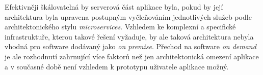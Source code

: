 Efektivněji škálovatelná by serverová část aplikace byla, pokud by její architektura byla upravena postupným vyčleňováním jednotlivých služeb podle architektonického stylu \textit{microservices}. Vzhledem ke komplexní a specifické infrastruktuře, kterou takové řešení vyžaduje, by ale taková architektura nebyla vhodná pro software dodávaný jako \textit{on premise}. Přechod na software \textit{on demand} je ale rozhodnutí zahrnující více faktorů než jen architektonická omezení aplikace a v současné době není vzhledem k prototypu uživatele aplikace možný.
